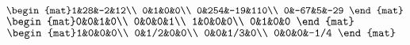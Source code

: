 \begin{Answer}
\Question $\begin{mat}1&28&-2&12\\  0&1&0&0\\  0&254&-19&110\\  0&-67&5&-29 \end{mat}$
\Question $\begin{mat}0&0&1&0\\  0&0&0&1\\  1&0&0&0\\  0&1&0&0 \end{mat}$
\Question $\begin{mat}1&0&0&0\\  0&1/2&0&0\\  0&0&1/3&0\\  0&0&0&-1/4 \end{mat}$
\end{Answer}
